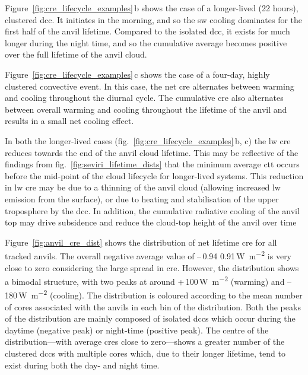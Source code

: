 Figure~\ref{fig:cre_lifecycle_examples}\,b shows the case of a longer-lived (22 hours), clustered \acrshort{dcc}. 
It initiates in the morning, and so the \acrshort{sw} cooling dominates for the first half of the anvil lifetime. 
Compared to the isolated \acrshort{dcc}, it exists for much longer during the night time, and so the cumulative average becomes positive over the full lifetime of the anvil cloud.

Figure~\ref{fig:cre_lifecycle_examples}\,c shows the case of a four-day, highly clustered convective event. 
In this case, the net \acrshort{cre} alternates between warming and cooling throughout the diurnal cycle. 
The cumulative \acrshort{cre} also alternates between overall warming and cooling throughout the lifetime of the anvil and results in a small net cooling effect.

In both the longer-lived cases (fig.~\ref{fig:cre_lifecycle_examples}\,b, c) the \acrshort{lw} \acrshort{cre} reduces towards the end of the anvil cloud lifetime. 
This may be reflective of the findings from fig.~\ref{fig:seviri_lifetime_dists} that the minimum average \acrshort{ctt} occurs before the mid-point of the cloud lifecycle for longer-lived systems. 
This reduction in \acrshort{lw} \acrshort{cre} may be due to a thinning of the anvil cloud (allowing increased \acrshort{lw} emission from the surface), or due to heating and stabilisation of the upper troposphere by the \acrshort{dcc}.
In addition, the cumulative radiative cooling of the anvil top may drive subsidence and reduce the cloud-top height of the anvil over time \citep{sokol_tropical_2020}

Figure~\ref{fig:anvil_cre_dist} shows the distribution of net lifetime \acrshort{cre} for all tracked anvils. 
The overall negative average value of --\,0.94\,\textpm\,0.91\,\unit{W m^{-2}} is very close to zero considering the large spread in \acrshort{cre}. 
However, the distribution shows a bimodal structure, with two peaks at around +\,100\,\unit{W m^{-2}} (warming) and --\,180\,\unit{W m^{-2}} (cooling). 
The distribution is coloured according to the mean number of cores associated with the anvils in each bin of the distribution. 
Both the peaks of the distribution are mainly composed of isolated \acrshort{dcc}s which occur during the daytime (negative peak) or night-time (positive peak). 
The centre of the distribution---with average \acrshort{cre}s close to zero---shows a greater number of the clustered \acrshort{dcc}s with multiple cores which, due to their longer lifetime, tend to exist during both the day- and night time.


